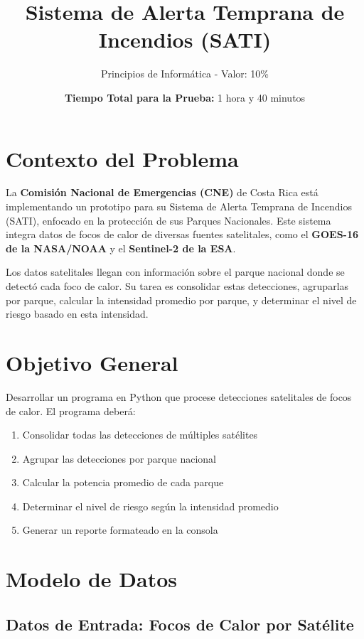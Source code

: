 \documentclass[11pt,a4paper]{article}
\title{\textbf{Sistema de Alerta Temprana de Incendios (SATI)}}
\author{Principios de Informática - Valor: 10\%}
\date{\textbf{Tiempo Total para la Prueba:} 1 hora y 40 minutos}
\begin{document}
\maketitle

\section*{Contexto del Problema}

La \textbf{Comisión Nacional de Emergencias (CNE)} de Costa Rica está implementando un prototipo para su Sistema de Alerta Temprana de Incendios (SATI), enfocado en la protección de sus Parques Nacionales. Este sistema integra datos de focos de calor de diversas fuentes satelitales, como el \textbf{GOES-16 de la NASA/NOAA} y el \textbf{Sentinel-2 de la ESA}. 

Los datos satelitales llegan con información sobre el parque nacional donde se detectó cada foco de calor. Su tarea es consolidar estas detecciones, agruparlas por parque, calcular la intensidad promedio por parque, y determinar el nivel de riesgo basado en esta intensidad.

\section*{Objetivo General}

Desarrollar un programa en Python que procese detecciones satelitales de focos de calor. El programa deberá:

\begin{enumerate}[leftmargin=*]
    \item Consolidar todas las detecciones de múltiples satélites
    \item Agrupar las detecciones por parque nacional
    \item Calcular la potencia promedio de cada parque
    \item Determinar el nivel de riesgo según la intensidad promedio
    \item Generar un reporte formateado en la consola
\end{enumerate}

\section{Modelo de Datos}

\subsection{Datos de Entrada: Focos de Calor por Satélite}
\end{document}
